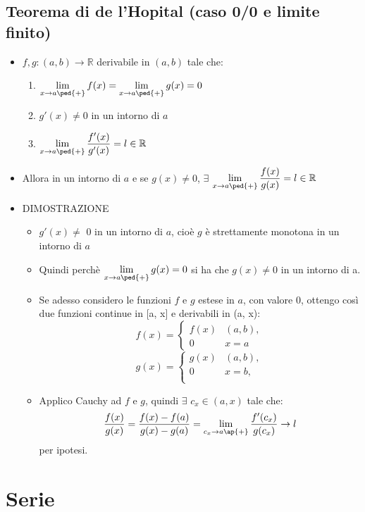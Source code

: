 \documentclass[10pt]{article}
\begin{document}
\subsection{Teorema di de l’Hopital (caso 0/0 e limite finito)}
\begin{itemize}
\item
$f,g: (a,b) \rightarrow  \mathbb{R}  $ derivabile in $ (a,b) $ tale che:
\begin{enumerate}
\item
$\displaystyle{\lim_{x \to a\ped{+}}{f(x)} = \lim_{x \to a\ped{+}}{g(x)} = 0}$ \medskip
\item
$g'(x)  \neq 0 $ in un intorno di $a$\medskip
\item
$\displaystyle{\lim_{x \to a\ped{+}}{\frac{f'(x)}{g'(x)}} = l \in \mathbb{R}}$\medskip
\end{enumerate}
\item
Allora in un intorno di $a$ e se $g(x) \neq 0 $, $ \exists$ $\displaystyle{\lim_{x \to a\ped{+}}{\frac{f(x)}{g(x)}}=l \in \mathbb{R}}$
\item \medskip
DIMOSTRAZIONE
\begin{itemize}
\item
$g'(x) \neq$ 0 in un intorno di $a$, cioè $g$ è strettamente monotona in un intorno di $a$
\item
Quindi perchè $\displaystyle{\lim_{x \to a\ped{+}}{g(x)=0}}$ si ha che $g(x) \neq 0$ in un intorno di a.
\item
Se adesso considero le funzioni $f$ e $g$ estese in $a$, con valore 0, ottengo così due funzioni continue in [a, x] e derivabili in (a, x):
$$ f(x) = \begin{cases} f(x) & (a,b),\\ 0 & x=a \end{cases} $$
$$ g(x) = \begin{cases} g(x) & (a,b),\\ 0 & x=b,\\ \end{cases} $$ \medskip
\item
Applico Cauchy ad $f$ e $g$, quindi $\exists $ $ c_x \in (a,x) $ tale che:
$$\frac{f(x)}{g(x)}=\frac{f(x)-f(a)}{g(x)-g(a)}= \lim_{c_x\to a\ap{+}}{\frac{f'(c_x)}{g(c_x)}}\rightarrow l$$ per ipotesi.
\end{itemize}
\end{itemize} 
\bigskip \bigskip \bigskip \bigskip
\section{Serie}
\end{document}
